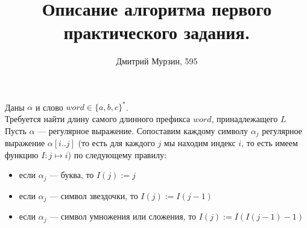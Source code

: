 \documentclass{article}
\begin{document}
\large

\title{Описание алгоритма первого практического задания.}
\author{Дмитрий Мурзин, 595}
\date{}
\maketitle

\noindent
Даны $\alpha$ и слово $word \in \{a, b, c\}^*$.\\
Требуется найти длину самого длинного префикса $word$, принадлежащего $L$\\

Пусть $\alpha$ --- регулярное выражение. 
Сопоставим каждому символу $\alpha_j$ регулярное выражение $\alpha[i..j]$ (то есть для каждого $j$ мы находим индекс $i$, то есть имеем функцию $I : j \mapsto i$) по следующему правилу: 
\begin{itemize}
\item если $\alpha_j$ --- буква, то $I(j) := j$
\item если $\alpha_j$ --- символ звездочки, то $I(j) := I(j - 1)$
\item если $\alpha_j$ --- символ умножения или сложения, то $I(j) := I(I(j - 1) - 1)$
\end{itemize}
\end{document}
